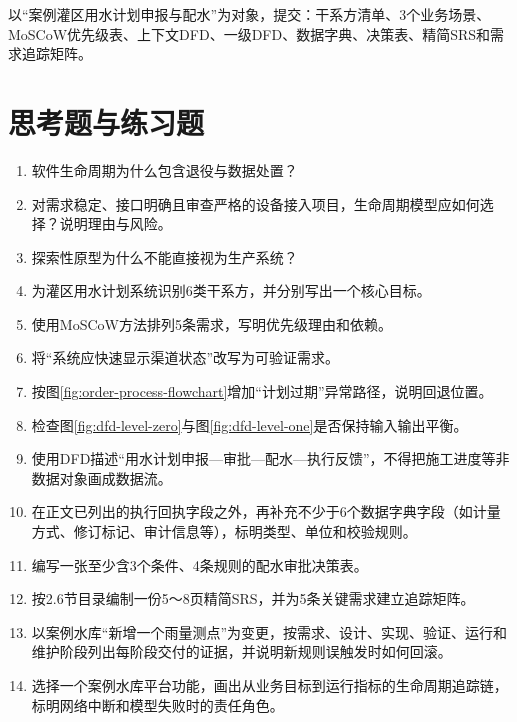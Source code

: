 以“案例灌区用水计划申报与配水”为对象，提交：干系方清单、3个业务场景、MoSCoW优先级表、上下文DFD、一级DFD、数据字典、决策表、精简SRS和需求追踪矩阵。

\section*{思考题与练习题}

\begin{enumerate}
\item 软件生命周期为什么包含退役与数据处置？
\item 对需求稳定、接口明确且审查严格的设备接入项目，生命周期模型应如何选择？说明理由与风险。
\item 探索性原型为什么不能直接视为生产系统？
\item 为灌区用水计划系统识别6类干系方，并分别写出一个核心目标。
\item 使用MoSCoW方法排列5条需求，写明优先级理由和依赖。
\item 将“系统应快速显示渠道状态”改写为可验证需求。
\item 按图\ref{fig:order-process-flowchart}增加“计划过期”异常路径，说明回退位置。
\item 检查图\ref{fig:dfd-level-zero}与图\ref{fig:dfd-level-one}是否保持输入输出平衡。
\item 使用DFD描述“用水计划申报—审批—配水—执行反馈”，不得把施工进度等非数据对象画成数据流。
\item 在正文已列出的执行回执字段之外，再补充不少于6个数据字典字段（如计量方式、修订标记、审计信息等），标明类型、单位和校验规则。
\item 编写一张至少含3个条件、4条规则的配水审批决策表。
\item 按2.6节目录编制一份5～8页精简SRS，并为5条关键需求建立追踪矩阵。
\item 以案例水库“新增一个雨量测点”为变更，按需求、设计、实现、验证、运行和维护阶段列出每阶段交付的证据，并说明新规则误触发时如何回滚。
\item 选择一个案例水库平台功能，画出从业务目标到运行指标的生命周期追踪链，标明网络中断和模型失败时的责任角色。
\end{enumerate}
